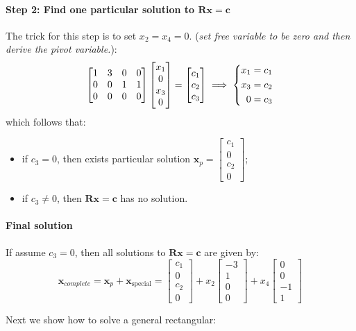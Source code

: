 \begin{example}
\paragraph{Step 2: Find one particular solution to $\bm{Rx} = \bm c$} The trick for this step is to set $x_2=x_4=0$. (\textit{set free variable to be zero and then derive the pivot variable.}):
\[
\begin{bmatrix}
1&3&0&0\\0&0&1&1\\0&0&0&0
\end{bmatrix}\begin{bmatrix}
x_1\\0\\x_3\\0
\end{bmatrix} = \begin{bmatrix}
c_1\\c_2\\c_3
\end{bmatrix}
\implies
\left\{\begin{rgathered}
x_1 =c_1\\
x_3 =c_2\\
0 =c_3
\end{rgathered}\right.
\]
which follows that:
\begin{itemize}
\item
if $c_3 = 0$, then exists particular solution $\bm x_p = \begin{bmatrix}
c_1\\0\\c_2\\0
\end{bmatrix}$;
\item
if $c_3\ne 0$, then $\bm{Rx} = \bm c$ has no solution.
\end{itemize}
\paragraph{Final solution} If assume $c_3= 0$, then all solutions to $\bm{Rx} = \bm c$ are given by:
\[
\bm x_{complete} = \bm x_p + \bm x_{\text{special}} = 
\begin{bmatrix}
c_1\\0\\c_2\\0
\end{bmatrix} + x_2\begin{bmatrix}
-3\\1\\0\\0
\end{bmatrix} + x_4\begin{bmatrix}
0\\0\\-1\\1
\end{bmatrix}
\]
\end{example}
Next we show how to solve a general rectangular:
\newpage
